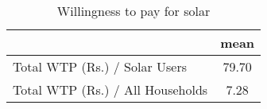\begin{table}[htbp]\centering
\def\sym#1{\ifmmode^{#1}\else\(^{#1}\)\fi}
\caption{Willingness to pay for solar\label {tab1}}
\begin{tabular}{l*{1}{c}}
\toprule
                    &        mean\\
\midrule
Total WTP (Rs.) / Solar Users&       79.70\\
Total WTP (Rs.) / All Households&        7.28\\
\bottomrule
\end{tabular}
\end{table}
